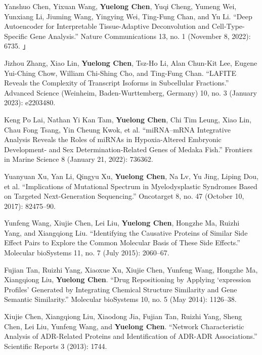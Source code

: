 

\begin{cventries}
\small{

  \begin{cvitems} %
      \item Yanshuo Chen, Yixuan Wang, \textbf{Yuelong Chen}, Yuqi Cheng, Yumeng Wei, Yunxiang Li, Jiuming Wang, Yingying Wei, Ting-Fung Chan, and Yu Li. “Deep Autoencoder for Interpretable Tissue-Adaptive Deconvolution and Cell-Type-Specific Gene Analysis.” Nature Communications 13, no. 1 (November 8, 2022): 6735. 」
      \item Jizhou Zhang, Xiao Lin, \textbf{Yuelong Chen}, Tsz-Ho Li, Alan Chun-Kit Lee, Eugene Yui-Ching Chow, William Chi-Shing Cho, and Ting-Fung Chan. “LAFITE Reveals the Complexity of Transcript Isoforms in Subcellular Fractions.” Advanced Science (Weinheim, Baden-Wurttemberg, Germany) 10, no. 3 (January 2023): e2203480. 
      \item Keng Po Lai, Nathan Yi Kan Tam, \textbf{Yuelong Chen}, Chi Tim Leung, Xiao Lin, Chau Fong Tsang, Yin Cheung Kwok, et al. “miRNA–mRNA Integrative Analysis Reveals the Roles of miRNAs in Hypoxia-Altered Embryonic Development- and Sex Determination-Related Genes of Medaka Fish.” Frontiers in Marine Science 8 (January 21, 2022): 736362. 
      \item Yuanyuan Xu,  Yan Li, Qingyu Xu, \textbf{Yuelong Chen}, Na Lv, Yu Jing, Liping Dou, et al. “Implications of Mutational Spectrum in Myelodysplastic Syndromes Based on Targeted Next-Generation Sequencing.” Oncotarget 8, no. 47 (October 10, 2017): 82475–90. 
      \item Yunfeng Wang, Xiujie Chen, Lei Liu, \textbf{Yuelong Chen}, Hongzhe Ma, Ruizhi Yang, and Xiangqiong Liu. “Identifying the Causative Proteins of Similar Side Effect Pairs to Explore the Common Molecular Basis of These Side Effects.” Molecular bioSystems 11, no. 7 (July 2015): 2060–67.
      \item Fujian Tan,  Ruizhi Yang, Xiaoxue Xu, Xiujie Chen, Yunfeng Wang, Hongzhe Ma, Xiangqiong Liu,  \textbf{Yuelong Chen}. “Drug Repositioning by Applying ‘expression Profiles’ Generated by Integrating Chemical Structure Similarity and Gene Semantic Similarity.” Molecular bioSystems 10, no. 5 (May 2014): 1126–38.
      \item Xiujie Chen,  Xiangqiong Liu, Xiaodong Jia, Fujian Tan, Ruizhi Yang, Sheng Chen, Lei Liu, Yunfeng Wang, and \textbf{Yuelong Chen}. “Network Characteristic Analysis of ADR-Related Proteins and Identification of ADR-ADR Associations.” Scientific Reports 3 (2013): 1744.
  \end{cvitems}
}







\end{cventries}